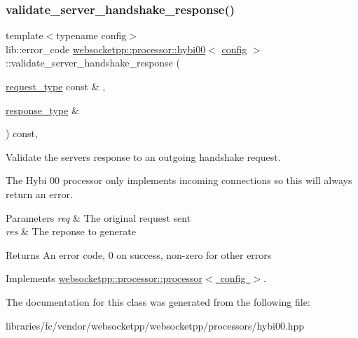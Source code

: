\subsubsection{\texorpdfstring{validate\+\_\+server\+\_\+handshake\+\_\+response()}{validate\_server\_handshake\_response()}}
{\footnotesize\ttfamily template$<$typename config$>$ \\
lib\+::error\+\_\+code \mbox{\hyperlink{classwebsocketpp_1_1processor_1_1hybi00}{websocketpp\+::processor\+::hybi00}}$<$ \mbox{\hyperlink{classconfig}{config}} $>$\+::validate\+\_\+server\+\_\+handshake\+\_\+response (\begin{DoxyParamCaption}\item[{\mbox{\hyperlink{classwebsocketpp_1_1http_1_1parser_1_1request}{request\+\_\+type}} const \&}]{,  }\item[{\mbox{\hyperlink{classwebsocketpp_1_1http_1_1parser_1_1response}{response\+\_\+type}} \&}]{ }\end{DoxyParamCaption}) const\hspace{0.3cm}{\ttfamily [inline]}, {\ttfamily [virtual]}}



Validate the server\textquotesingle{}s response to an outgoing handshake request. 

The Hybi 00 processor only implements incoming connections so this will always return an error.


\begin{DoxyParams}{Parameters}
{\em req} & The original request sent \\
\hline
{\em res} & The reponse to generate \\
\hline
\end{DoxyParams}
\begin{DoxyReturn}{Returns}
An error code, 0 on success, non-\/zero for other errors 
\end{DoxyReturn}


Implements \mbox{\hyperlink{classwebsocketpp_1_1processor_1_1processor_ab1228fa9350d9646379888ad528fd4c4}{websocketpp\+::processor\+::processor$<$ config $>$}}.



The documentation for this class was generated from the following file\+:\begin{DoxyCompactItemize}
\item 
libraries/fc/vendor/websocketpp/websocketpp/processors/hybi00.\+hpp\end{DoxyCompactItemize}
